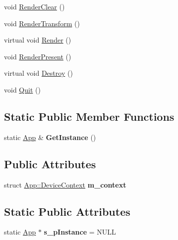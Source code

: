 \begin{DoxyCompactItemize}
\item 
void \mbox{\hyperlink{class_app_a37267ab01a867e0aa20b99114a1c8b08}{Render\+Clear}} ()
\item 
void \mbox{\hyperlink{class_app_a391b6a41518e0925a3877cb70ea963a3}{Render\+Transform}} ()
\item 
virtual void \mbox{\hyperlink{class_app_a7f42e947a052412c193c689b7e7a73cc}{Render}} ()
\item 
void \mbox{\hyperlink{class_app_a8b06af681cd1bbc4d1683b692cce6249}{Render\+Present}} ()
\item 
virtual void \mbox{\hyperlink{class_app_a66dd2456f5144a9747d6ebb291d9ead4}{Destroy}} ()
\item 
void \mbox{\hyperlink{class_app_ad76985d9eeb1eb7cb2fa0804428bd2da}{Quit}} ()
\end{DoxyCompactItemize}
\subsection*{Static Public Member Functions}
\begin{DoxyCompactItemize}
\item 
\mbox{\label{class_app_a0c6994abed12608930ec20ae632c1b9e}} 
static \mbox{\hyperlink{class_app}{App}} \& {\bfseries Get\+Instance} ()
\end{DoxyCompactItemize}
\subsection*{Public Attributes}
\begin{DoxyCompactItemize}
\item 
\mbox{\label{class_app_aa8c0dd9148bd7b81023e3252ad0d07bf}} 
struct \mbox{\hyperlink{struct_app_1_1_device_context}{App\+::\+Device\+Context}} {\bfseries m\+\_\+context}
\end{DoxyCompactItemize}
\subsection*{Static Public Attributes}
\begin{DoxyCompactItemize}
\item 
\mbox{\label{class_app_a608f2a0e58855b254bfe952131662267}} 
static \mbox{\hyperlink{class_app}{App}} $\ast$ {\bfseries s\+\_\+p\+Instance} = N\+U\+LL
\end{DoxyCompactItemize}
